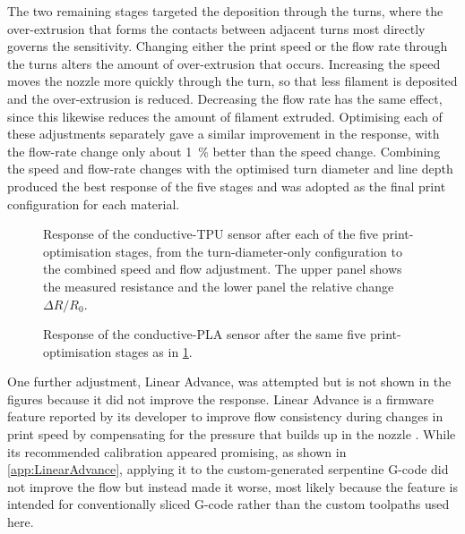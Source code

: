 The two remaining stages targeted the deposition through the turns, where the over-extrusion that forms the contacts between adjacent turns most directly governs the sensitivity. Changing either the print speed or the flow rate through the turns alters the amount of over-extrusion that occurs. Increasing the speed moves the nozzle more quickly through the turn, so that less filament is deposited and the over-extrusion is reduced. Decreasing the flow rate has the same effect, since this likewise reduces the amount of filament extruded. Optimising each of these adjustments separately gave a similar improvement in the response, with the flow-rate change only about \SI{1}{\percent} better than the speed change. Combining the speed and flow-rate changes with the optimised turn diameter and line depth produced the best response of the five stages and was adopted as the final print configuration for each material.

\begin{figure}[H]
\centering

    \caption{Response of the conductive-TPU sensor after each of the five print-optimisation stages, from the turn-diameter-only configuration to the combined speed and flow adjustment. The upper panel shows the measured resistance and the lower panel the relative change $\Delta R/R_0$.}
    \label{fig:opt_tpu}
\end{figure}

\begin{figure}[H]
\centering

    \caption{Response of the conductive-PLA sensor after the same five print-optimisation stages as in \cref{fig:opt_tpu}.}
    \label{fig:opt_pla}
\end{figure}
 
One further adjustment, Linear Advance, was attempted but is not shown in the figures because it did not improve the response. Linear Advance is a firmware feature reported by its developer to improve flow consistency during changes in print speed by compensating for the pressure that builds up in the nozzle \cite{Lin_adv}. While its recommended calibration appeared promising, as shown in \cref{app:LinearAdvance}, applying it to the custom-generated serpentine G-code did not improve the flow but instead made it worse, most likely because the feature is intended for conventionally sliced G-code rather than the custom toolpaths used here.
 
